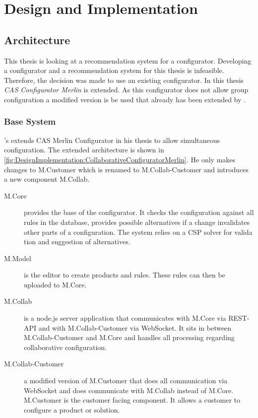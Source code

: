 \chapter{Design and Implementation}
\label{ch:DesignImplementation}

\section{Architecture}
\label{sec:DesignImplementation:Architecture}

This thesis is looking at a recommendation system for a configurator. Developing a configurator and a recommendation system for this thesis is infeasible. Therefore, the decision was made to use an existing configurator. In this thesis \emph{CAS Configurator Merlin} \cite{IndustrySpecificProduct2020} is extended. As this configurator does not allow group configuration a modified version is be used that already has been extended by \citeauthor{raabKollaborativeProduktkonfigurationEchtzeit2019} \cite{raabKollaborativeProduktkonfigurationEchtzeit2019}. 

\subsection{Base System}
\label{subsec:DesignImplementation:BaseSystem}

\citeauthor{raabKollaborativeProduktkonfigurationEchtzeit2019}'s \cite{raabKollaborativeProduktkonfigurationEchtzeit2019} extends CAS Merlin Configurator in his thesis to allow simultaneous configuration. The extended architecture is shown in \autoref{fig:DesignImplementation:CollaborativeConfiguratorMerlin}.
He only makes changes to M.Customer which is renamed to M.Collab-Customer and introduces a new component M.Collab.

\begin{description}
    \item[M.Core] provides the base of the configurator. It checks the configuration against all rules in the database, provides possible alternatives if a change invalidates other parts of a configuration. The system relies on a CSP solver for valida tion and suggestion of alternatives.
    \item[M.Model] is the editor to create products and rules. These rules can then be uploaded to M.Core.
    \item[M.Collab] is a node.js server application that communicates with M.Core via REST-API and with M.Collab-Customer via WebSocket. It sits in between M.Collab-Customer and M.Core and handles all processing regarding collaborative configuration.
    \item[M.Collab-Customer] a modified version of M.Customer that does all communication via WebSocket and does communicate with M.Collab instead of M.Core. M.Customer is the customer facing component. It allows a customer to configure a product or solution.
\end{description}

